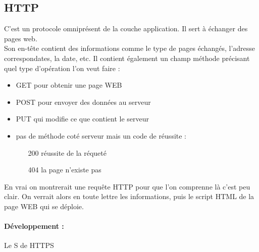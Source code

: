 \subsection{HTTP}

C'est un protocole omniprésent de la couche application. Il sert à échanger des pages web.\\

Son en-tête contient des informations comme le type de pages échangés, l'adresse correspondates, la date, etc. Il contient également un champ méthode précisant quel type d'opération l'on veut faire :
\begin{itemize}
	\item GET pour obtenir une page WEB
	\item POST pour envoyer des données au serveur
	\item PUT qui modifie ce que contient le serveur
	\item pas de méthode coté serveur mais un code de réussite :\begin{itemize}
		\item[200] réussite de la réqueté
		\item[404] la page n'existe pas
	\end{itemize}
\end{itemize}

\begin{com}
	En vrai on montrerait une requête HTTP pour que l'on comprenne là c'est peu clair. On verrait alors en toute lettre les informations, puis le script HTML de la page WEB qui se déploie.
\end{com}

\paragraph{Développement :} Le S de HTTPS